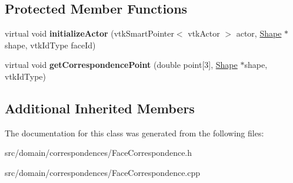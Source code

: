 \subsection*{Protected Member Functions}
\begin{DoxyCompactItemize}
\item 
\hypertarget{class_face_correspondence_a1ea27f04de756e160ed0d80d2a685906}{}virtual void {\bfseries initialize\+Actor} (vtk\+Smart\+Pointer$<$ vtk\+Actor $>$ actor, \hyperlink{class_shape}{Shape} $\ast$shape, vtk\+Id\+Type face\+Id)\label{class_face_correspondence_a1ea27f04de756e160ed0d80d2a685906}

\item 
\hypertarget{class_face_correspondence_ac0314fcce59a91ed60a1a5cf9e7eec82}{}virtual void {\bfseries get\+Correspondence\+Point} (double point\mbox{[}3\mbox{]}, \hyperlink{class_shape}{Shape} $\ast$shape, vtk\+Id\+Type)\label{class_face_correspondence_ac0314fcce59a91ed60a1a5cf9e7eec82}

\end{DoxyCompactItemize}
\subsection*{Additional Inherited Members}


The documentation for this class was generated from the following files\+:\begin{DoxyCompactItemize}
\item 
src/domain/correspondences/Face\+Correspondence.\+h\item 
src/domain/correspondences/Face\+Correspondence.\+cpp\end{DoxyCompactItemize}
